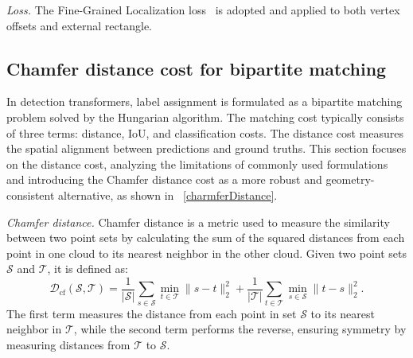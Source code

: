 \documentclass[lettersize,journal]{IEEEtran}
\begin{document}
\textit{Loss.}
The Fine-Grained Localization loss~\cite{dfine} is adopted and applied to both vertex offsets and external rectangle.






\subsection{Chamfer distance cost for bipartite matching}\label{sec:chamfer}

In detection transformers, label assignment is formulated as a bipartite matching problem solved by the Hungarian algorithm. The matching cost typically consists of three terms: distance, IoU, and classification costs. The distance cost measures the spatial alignment between predictions and ground truths. This section focuses on the distance cost, analyzing the limitations of commonly used formulations and introducing the Chamfer distance cost as a more robust and geometry-consistent alternative, as shown in \figurename~\ref{charmferDistance}.

\textit{Chamfer distance.}
Chamfer distance is a metric used to measure the similarity between two point sets by calculating the sum of the squared distances from each point in one cloud to its nearest neighbor in the other cloud. Given two point sets $\mathcal{S}$ and $\mathcal{T}$, it is defined as:
\begin{equation}\label{eq:chamferdistance}
\mathcal{D}_{\text{cf}}(\mathcal{S}, \mathcal{T}) =
\frac{1}{|\mathcal{S}|}\sum_{s \in \mathcal{S}} \min_{t \in \mathcal{T}} \|s - t\|_2^2 +
\frac{1}{|\mathcal{T}|}\sum_{t \in \mathcal{T}} \min_{s \in \mathcal{S}} \|t - s\|_2^2.
\end{equation}
The first term measures the distance from each point in set $\mathcal{S}$ to its nearest neighbor in $\mathcal{T}$, while the second term performs the reverse, ensuring symmetry by measuring distances from $\mathcal{T}$ to $\mathcal{S}$.



\contrastiveDenoise
\end{document}
